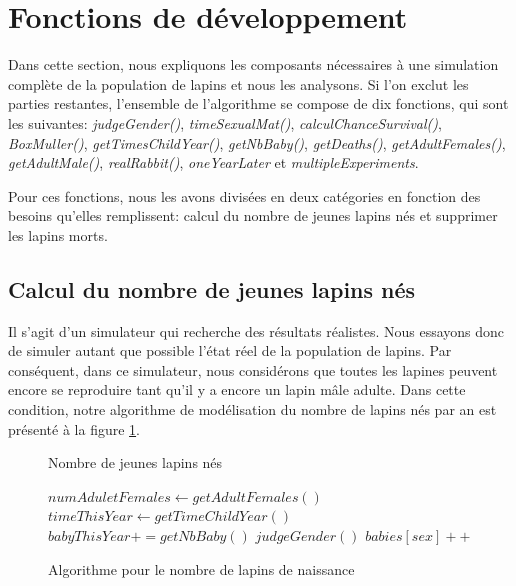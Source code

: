 \documentclass[12pt]{article}
\begin{document}
    \newpage    
	\section{Fonctions de développement}
        Dans cette section, nous expliquons les composants nécessaires à une simulation complète de la population de lapins et nous    les analysons. Si l'on exclut les parties restantes, l'ensemble de l'algorithme se compose de dix fonctions, qui sont les suivantes: \emph{judgeGender()}, \emph{timeSexualMat()}, \emph{calculChanceSurvival()}, \emph{BoxMuller()}, \emph{getTimesChildYear()}, \emph{getNbBaby()}, \emph{getDeaths()}, \emph{getAdultFemales()}, \emph{getAdultMale()}, \emph{realRabbit()}, \emph{oneYearLater} et \emph{multipleExperiments}. 
        \par 
        Pour ces fonctions, nous les avons divisées en deux catégories en fonction des besoins qu'elles remplissent: calcul du nombre de jeunes lapins nés et supprimer les lapins morts.
    
        \subsection{Calcul du nombre de jeunes lapins nés}
        Il s'agit d'un simulateur qui recherche des résultats réalistes. Nous essayons donc de simuler autant que possible l'état réel de la population de lapins. Par conséquent, dans ce simulateur, nous considérons que toutes les lapines peuvent encore se reproduire tant qu'il y a encore un lapin mâle adulte. Dans cette condition, notre algorithme de modélisation du nombre de lapins nés par an est présenté à la figure \ref{algo:birth}.
        \begin{figure}[htbp]
            \centering
            \label{algo:birth}
            \begin{algorithm}[H]
                \begin{algorithmic}[1]
                    \caption{Nombre de jeunes lapins nés}
                    \State $numAduletFemales \leftarrow getAdultFemales()$
                            \State $timeThisYear \leftarrow getTimeChildYear()$
                                \State $babyThisYear += getNbBaby() $
                            \EndFor
                        \EndFor
                            \State $judgeGender()$
                            \State $babies[sex]++$
                        \EndFor
                    \EndIf
                \end{algorithmic}
            \end{algorithm}
            \caption{Algorithme pour le nombre de lapins de naissance} 
        \end{figure}
        
\end{document}
